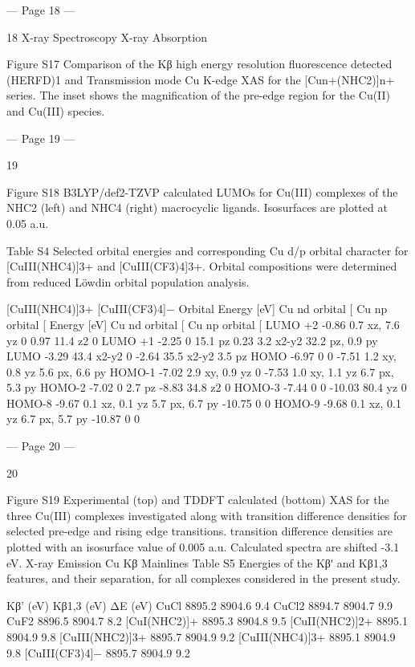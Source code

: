 --- Page 18 ---
 
18 
X-ray Spectroscopy 
X-ray Absorption 
 
Figure S17 Comparison of the Kβ high energy resolution fluorescence detected (HERFD)1 and Transmission 
mode Cu K-edge XAS for the [Cun+(NHC2)]n+ series. The inset shows the magnification of the pre-edge region 
for the Cu(II) and Cu(III) species. 
 


--- Page 19 ---
 
19 
 
Figure S18 B3LYP/def2-TZVP calculated LUMOs for Cu(III) complexes of the NHC2 (left) and NHC4 (right) 
macrocyclic ligands. Isosurfaces are plotted at 0.05 a.u. 
 
Table S4 Selected orbital energies and corresponding Cu d/p orbital character for [CuIII(NHC4)]3+ and 
[CuIII(CF3)4]3+. Orbital compositions were determined from reduced Löwdin orbital population analysis. 
 
[CuIII(NHC4)]3+ 
[CuIII(CF3)4]− 
Orbital 
Energy [eV] 
Cu nd orbital [%
Cu np orbital [%
Energy [eV] 
Cu nd orbital [%
Cu np orbital [%
LUMO +2 
-0.86 
0.7 xz, 7.6 yz 
0 
0.97 
11.4 z2 
0 
LUMO +1 
-2.25 
0 
15.1 pz 
0.23 
3.2 x2-y2 
32.2 pz, 0.9 py 
LUMO 
-3.29 
43.4 x2-y2 
0 
-2.64 
35.5 x2-y2 
3.5 pz 
HOMO 
-6.97 
0 
0 
-7.51 
1.2 xy, 0.8 yz 
5.6 px, 6.6 py 
HOMO-1 
-7.02 
2.9 xy, 0.9 yz 
0 
-7.53 
1.0 xy, 1.1 yz 
6.7 px, 5.3 py 
HOMO-2 
-7.02 
0 
2.7 pz 
-8.83 
34.8 z2 
0 
HOMO-3 
-7.44 
0 
0 
-10.03 
80.4 yz 
0 
HOMO-8 
-9.67 
0.1 xz, 0.1 yz 
5.7 px, 6.7 py 
-10.75 
0 
0 
HOMO-9 
-9.68 
0.1 xz, 0.1 yz 
6.7 px, 5.7 py 
-10.87 
0 
0 
 
 
 
 


--- Page 20 ---
 
20 
 
Figure S19 Experimental (top) and TDDFT calculated (bottom) XAS for the three Cu(III) complexes investigated 
along with transition difference densities for selected pre-edge and rising edge transitions. transition difference 
densities are plotted with an isosurface value of 0.005 a.u. Calculated spectra are shifted -3.1 eV. 
X-ray Emission 
Cu Kβ Mainlines 
Table S5 Energies of the Kβʹ and Kβ1,3 features, and their separation, for all complexes considered in the present 
study. 
 
Kβ’ (eV) 
Kβ1,3 (eV) 
ΔE (eV) 
CuCl 
8895.2 
8904.6 
9.4 
CuCl2 
8894.7 
8904.7 
9.9 
CuF2 
8896.5 
8904.7 
8.2 
[CuI(NHC2)]+ 
8895.3 
8904.8 
9.5 
[CuII(NHC2)]2+ 
8895.1 
8904.9 
9.8 
[CuIII(NHC2)]3+ 
8895.7 
8904.9 
9.2 
[CuIII(NHC4)]3+ 
8895.1 
8904.9 
9.8 
[CuIII(CF3)4]− 
8895.7 
8904.9 
9.2 
 


